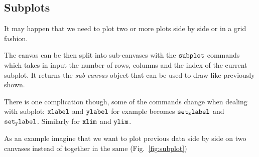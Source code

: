 \subsection{Subplots}\label{subplots}

It may happen that we need to plot two or more plots side by side or in
a grid fashion.

The canvas can be then split into sub-canvases with the \(\tt{subplot}\)
commands which takes in input the number of rows, columns and the index
of the current subplot. It returns the \emph{sub-canvas} object that can
be used to draw like previously shown.

There is one complication though, some of the commands change when
dealing with subplot: \(\tt{xlabel}\) and \(\tt{ylabel}\) for example
becomes \(\tt{set_xlabel}\) and \(\tt{set_ylabel}\). Similarly for
\(\tt{xlim}\) and \(\tt{ylim}\).

As an example imagine that we want to plot previous data side by
side on two canvases instead of together in the same (Fig.~\ref{fig:subplot})

